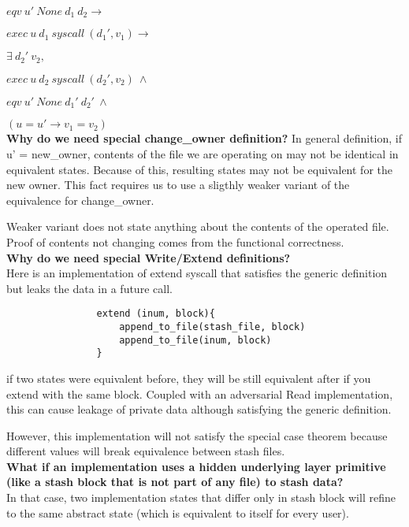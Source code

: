 \documentclass[onecolumn]{paper}
\begin{document}
			$eqv\ u'\ None\ d_1\ d_2 \rightarrow$
			
			$exec\ u\ d_1\ syscall\ (d_1', v_1) \rightarrow$
			
			$\exists\ d_2'\ v_2,$
			
			$exec\ u\ d_2\ syscall\ (d_2', v_2)\ \wedge$
			
			$eqv\ u'\ None\ d_1'\ d_2'\ \wedge$
			
			$(u = u' \rightarrow v_1 = v_2)$\\
			
			{\bf Why do we need special change\_owner definition?}
			In general definition, if u' = new\_owner, contents of the file we are operating on may not be identical in equivalent states. 
			Because of this, resulting states may not be equivalent for the new owner. 
			This fact requires us to use a sligthly weaker variant of the equivalence for change\_owner.
			
			Weaker variant does not state anything about the contents of the operated file.
			Proof of contents not changing comes from the functional correctness.\\
			
			
			{\bf Why do we need special Write/Extend definitions?}\\
			Here is an implementation of extend syscall that satisfies the generic definition but leaks the data in a future call.
			
			\begin{verbatim}
				extend (inum, block){
					append_to_file(stash_file, block)
					append_to_file(inum, block)
				}
			\end{verbatim}
			
			
			if two states were equivalent before, they will be still equivalent after if  you extend with the same block. Coupled with an adversarial Read implementation, this can cause leakage of private data although satisfying the generic definition.
			
			However, this implementation will not satisfy the special case theorem because different values will break equivalence between stash files.\\
			
			{\bf What if an implementation uses a hidden underlying layer primitive (like a stash block that is not part of any file) to stash data?}\\
			
			In that case, two implementation states that differ only in stash block will refine to the same abstract state (which is equivalent to itself for every user). 
			
\end{document}
